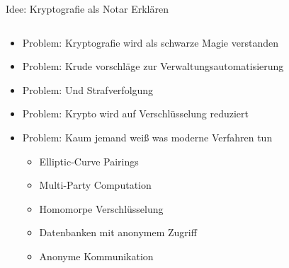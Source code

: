\documentclass[german]{rosenpass-beamer}
\begin{document}
\begin{frame}{Idee: Kryptografie als Notar Erklären}
\begin{columns}[c]

\begin{column}{0.7\textwidth}
  \begin{itemize}
    \item Problem: Kryptografie wird als schwarze Magie verstanden
    \item Problem: Krude vorschläge zur Verwaltungsautomatisierung
    \item Problem: Und Strafverfolgung
    \item Problem: Krypto wird auf Verschlüsselung reduziert
    \item
      Problem: Kaum jemand weiß was moderne Verfahren tun
      \begin{itemize}
        \item Elliptic-Curve Pairings
        \item Multi-Party Computation
        \item Homomorpe Verschlüsselung
        \item Datenbanken mit anonymem Zugriff
        \item Anonyme Kommunikation
      \end{itemize}
  \end{itemize}
\end{column}


\end{columns}
\end{frame}
\end{document}
